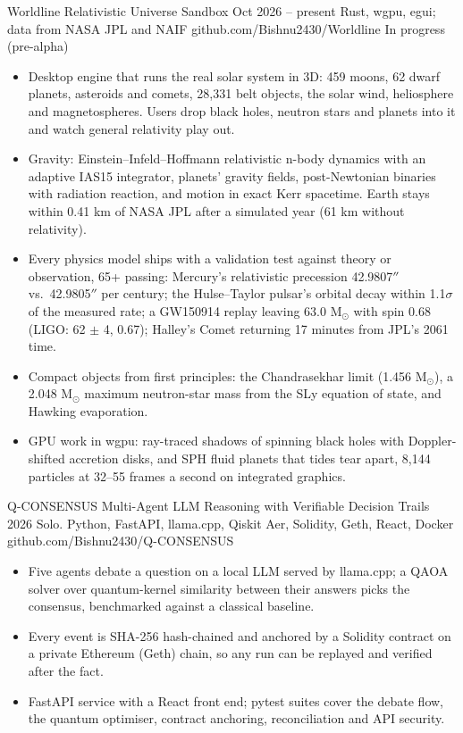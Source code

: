 \cvproject
{Worldline}
{Relativistic Universe Sandbox}
{Oct 2026 -- present}
{Rust, wgpu, egui; data from NASA JPL and NAIF}
{github.com/Bishnu2430/Worldline}
{In progress (pre-alpha)}
\begin{itemize}
\item Desktop engine that runs the real solar system in 3D: 459 moons, 62 dwarf planets, asteroids and comets, 28,331 belt objects, the solar wind, heliosphere and magnetospheres. Users drop black holes, neutron stars and planets into it and watch general relativity play out.
\item Gravity: Einstein--Infeld--Hoffmann relativistic n-body dynamics with an adaptive IAS15 integrator, planets' gravity fields, post-Newtonian binaries with radiation reaction, and motion in exact Kerr spacetime. Earth stays within 0.41 km of NASA JPL after a simulated year (61 km without relativity).
\item Every physics model ships with a validation test against theory or observation, 65+ passing: Mercury's relativistic precession 42.9807$''$ vs.\ 42.9805$''$ per century; the Hulse--Taylor pulsar's orbital decay within 1.1$\sigma$ of the measured rate; a GW150914 replay leaving 63.0 M$_\odot$ with spin 0.68 (LIGO: 62 $\pm$ 4, 0.67); Halley's Comet returning 17 minutes from JPL's 2061 time.
\item Compact objects from first principles: the Chandrasekhar limit (1.456 M$_\odot$), a 2.048 M$_\odot$ maximum neutron-star mass from the SLy equation of state, and Hawking evaporation.
\item GPU work in wgpu: ray-traced shadows of spinning black holes with Doppler-shifted accretion disks, and SPH fluid planets that tides tear apart, 8,144 particles at 32--55 frames a second on integrated graphics.
\end{itemize}

\cvgap

\cvproject
{Q-CONSENSUS}
{Multi-Agent LLM Reasoning with Verifiable Decision Trails}
{2026}
{Solo. Python, FastAPI, llama.cpp, Qiskit Aer, Solidity, Geth, React, Docker}
{github.com/Bishnu2430/Q-CONSENSUS}
{}
\begin{itemize}
\item Five agents debate a question on a local LLM served by llama.cpp; a QAOA solver over quantum-kernel similarity between their answers picks the consensus, benchmarked against a classical baseline.
\item Every event is SHA-256 hash-chained and anchored by a Solidity contract on a private Ethereum (Geth) chain, so any run can be replayed and verified after the fact.
\item FastAPI service with a React front end; pytest suites cover the debate flow, the quantum optimiser, contract anchoring, reconciliation and API security.
\end{itemize}

